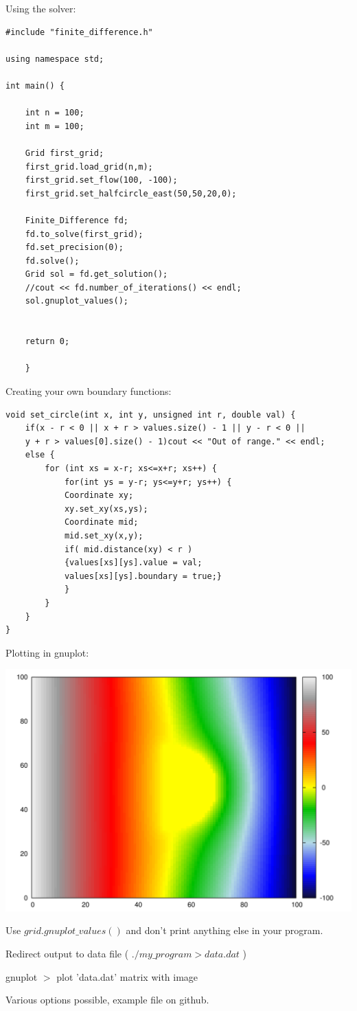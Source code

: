 \documentclass[a4paper,10pt]{article}
\begin{document}
\thispagestyle{empty}
Using the solver:
\begin{lstlisting}
#include "finite_difference.h"

using namespace std;

int main() {

	int n = 100;
	int m = 100;

	Grid first_grid;
	first_grid.load_grid(n,m);
	first_grid.set_flow(100, -100);
	first_grid.set_halfcircle_east(50,50,20,0);

	Finite_Difference fd;
	fd.to_solve(first_grid);
	fd.set_precision(0);
	fd.solve();
	Grid sol = fd.get_solution();
	//cout << fd.number_of_iterations() << endl;
	sol.gnuplot_values();
	

	return 0;

	}\end{lstlisting}
	
\newpage

Creating your own boundary functions:
\begin{lstlisting}
void set_circle(int x, int y, unsigned int r, double val) {
	if(x - r < 0 || x + r > values.size() - 1 || y - r < 0 || 
	y + r > values[0].size() - 1)cout << "Out of range." << endl;
	else {
		for (int xs = x-r; xs<=x+r; xs++) {
			for(int ys = y-r; ys<=y+r; ys++) {
			Coordinate xy;
			xy.set_xy(xs,ys);
			Coordinate mid;
			mid.set_xy(x,y);
			if( mid.distance(xy) < r )
			{values[xs][ys].value = val; 
			values[xs][ys].boundary = true;}
			}
		}
	}
}
\end{lstlisting}
\newpage
Plotting in gnuplot:



\includegraphics[width=\textwidth]{circle.png}



Use $grid.gnuplot\_values()$ and don't print anything else in your program.
\vspace{1cm}

Redirect output to data file ( $./my\_program > data.dat$ )
\vspace{1cm}

gnuplot $>$ plot 'data.dat' matrix with image


\vspace{3cm}


Various options possible, example file on github.
\end{document}
